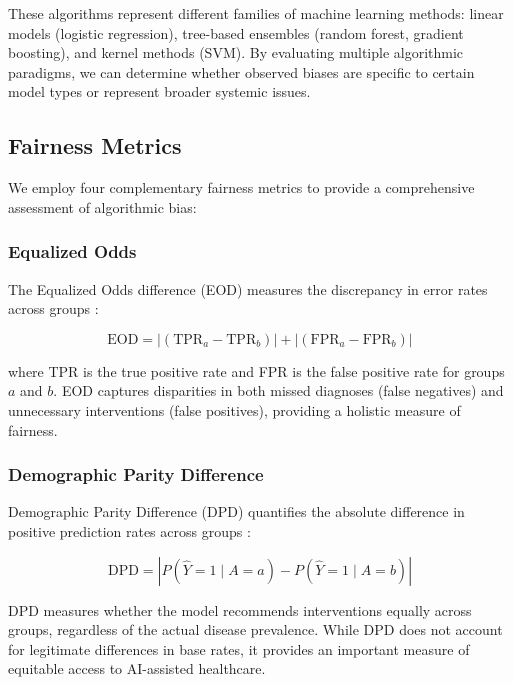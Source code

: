 These algorithms represent different families of machine learning methods: 
linear models (logistic regression), tree-based ensembles (random forest, 
gradient boosting), and kernel methods (SVM). By evaluating multiple 
algorithmic paradigms, we can determine whether observed biases are 
specific to certain model types or represent broader systemic issues.

\subsection{Fairness Metrics}

We employ four complementary fairness metrics to provide a comprehensive 
assessment of algorithmic bias:

\subsubsection{Equalized Odds}

The Equalized Odds difference (EOD) measures the discrepancy in error 
rates across groups \cite{hardt2016}:

\begin{equation}
\text{EOD} = |(\text{TPR}_a - \text{TPR}_b)| + |(\text{FPR}_a - \text{FPR}_b)|
\label{eq:eod}
\end{equation}

\noindent where TPR is the true positive rate and FPR is the false positive 
rate for groups $a$ and $b$. EOD captures disparities in both missed 
diagnoses (false negatives) and unnecessary interventions (false positives), 
providing a holistic measure of fairness.

\subsubsection{Demographic Parity Difference}

Demographic Parity Difference (DPD) quantifies the absolute difference in 
positive prediction rates across groups \cite{dwork2012}:

\begin{equation}
\text{DPD} = |P(\hat{Y}=1 \mid A=a) - P(\hat{Y}=1 \mid A=b)|
\label{eq:dpd}
\end{equation}

DPD measures whether the model recommends interventions equally across 
groups, regardless of the actual disease prevalence. While DPD does not 
account for legitimate differences in base rates, it provides an important 
measure of equitable access to AI-assisted healthcare.

